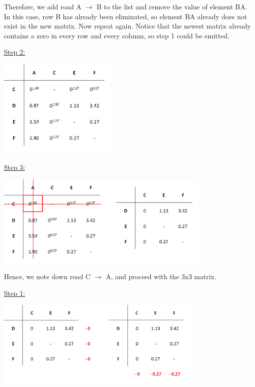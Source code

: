 \noindent
Therefore, we add road A $\rightarrow$ B to the list and remove the value of element BA. In this case, row B has already been eliminated, so element BA already does not exist in the new matrix. Now repeat again. Notice that the newest matrix already contains a zero in every row and every column, so step 1 could be emitted.

\vspace{5mm}
\underline{Step 2:}
\vspace{-3mm}
\begin{center}
	\includegraphics[height=4.8cm]{3pen}
\end{center}	

\underline{Step 3:}
\vspace{-2mm}
\begin{center}
	\includegraphics[height=4.5cm]{3elim4}
\end{center}

\noindent
Hence, we note down road C $\rightarrow$ A, and proceed with the 3x3 matrix.


\vspace{5mm}
\underline{Step 1:} 

\begin{center}
	\includegraphics[height=4.2cm]{4red0} 
\end{center}	


